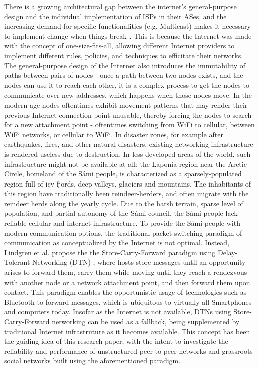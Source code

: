 There is a growing architectural gap between the internet's general-purpose design and the individual implementation of ISPs in their ASes, and the increasing demand for specific functionalities (e.g. Multicast) makes it necessary to implement change when things break \cite{handley}. This is because the Internet was made with the concept of one-size-fits-all, allowing different Internet providers to implement different rules, policies, and techniques to efficitate their networks.
The general-purpose design of the Internet also introduces the immutability of paths between pairs of nodes - once a path between two nodes exists, and the nodes can use it to reach each other, it is a complex process to get the nodes to communicate over new addresses, which happens when those nodes move. In the modern age nodes oftentimes exhibit movement patterns that may render their previous Internet connection point unusable, thereby forcing the nodes to search for a new attachment point - oftentimes switching from WiFi to cellular, between WiFi networks, or cellular to WiFi. In disaster zones, for example after earthquakes, fires, and other natural disasters, existing networking infrastructure is rendered useless due to destruction.
In less-developed areas of the world, such infrastructure might not be available at all: the Laponia region near the Arctic Circle, homeland of the Sámi people, is characterized as a sparsely-populated region full of icy fjords, deep valleys, glaciers and mountains.
The inhabitants of this region have traditionally been reindeer-herders, and often migrate with the reindeer herds along the yearly cycle. Due to the harsh terrain, sparse level of population, and partial autonomy of the Sámi council, the Sámi people lack reliable cellular and internet infrastructure. To provide the Sámi people with modern communication options, the traditional packet-switching paradigm of communication as conceptualized by the Internet is not optimal.
Instead, Lindgren et al. propose the the Store-Carry-Forward paradigm using Delay-Tolerant Networking (DTN) \cite{sami}, where hosts store messages until an opportunity arises to forward them, carry them while moving until they reach a rendezvous with another node or a network attachment point, and then forward them upon contact. This paradigm enables the opportunistic usage of technologies such as Bluetooth to forward messages, which is ubiquitous to virtually all Smartphones and computers today.
Insofar as the Internet is not available, DTNs using Store-Carry-Forward networking can be used as a fallback, being supplemented by traditional Internet infrastruture as it becomes available.
This concept has been the guiding idea of this research paper, with the intent to investigate the reliability and performance of unstructured peer-to-peer networks and grassroots social networks built using the aforementioned paradigm.